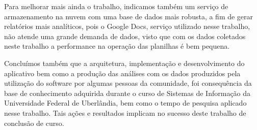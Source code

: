 \documentclass[12pt, %
openright, 
oneside,
a4paper,
brazil]{facom-ufu-abntex2}
\begin{document}
Para melhorar mais ainda o trabalho, indicamos também um serviço de armazenamento na nuvem com uma base de dados mais robusta, a fim de gerar relatórios mais analíticos, pois o Google Docs, serviço utilizado nesse trabalho, não atende uma grande demanda de dados, visto que com os dados coletados neste trabalho a performance na operação das planilhas é bem pequena. 

Concluímos também que a arquitetura, implementação e desenvolvimento do aplicativo bem como a produção das análises com os dados produzidos pela utilização do software por algumas pessoas da comunidade, foi consequência da base de conhecimento adquirida durante o curso de Sistemas de Informação da Universidade Federal de Uberlândia, bem como o tempo de pesquisa aplicado nesse trabalho. Tais ações e resultados implicam no sucesso deste trabalho de conclusão de curso.




\postextual









\end{document}
